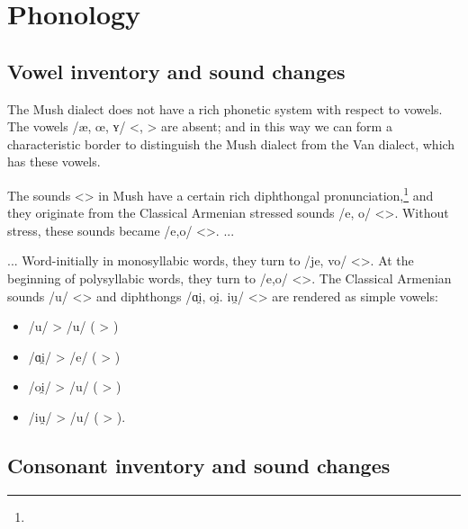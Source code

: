 \section{Phonology}
\subsection{Vowel inventory and sound changes}

The Mush dialect does not have a rich phonetic system with respect to vowels. The vowels /æ, œ, ʏ/ <, > are absent; and in this way we can form a characteristic border to distinguish the Mush dialect from the Van dialect, which has these vowels. 

The sounds <> in Mush have a certain rich diphthongal pronunciation,\footnote{} and they originate from the Classical Armenian stressed sounds /e, o/ <>. Without stress, these sounds became /e,o/ <>. ... 


\begin{adjarianpage}\label{page:117}\end{adjarianpage}%

... Word-initially in monosyllabic words, they turn to /je, vo/ <>. At the beginning of polysyllabic words, they turn to /e,o/ <>. The Classical Armenian sounds /u/ <> and diphthongs /ɑi̯, oi̯. iu̯/ <> are rendered as simple vowels:

\begin{itemize}
	\item /u/ > /u/ ( > ) 
	\item /ɑi̯/ > /e/ ( > )
	\item /oi̯/ > /u/ ( > )
	\item /iu̯/ > /u/ ( > ). 
\end{itemize}


\subsection{Consonant inventory and sound changes}

